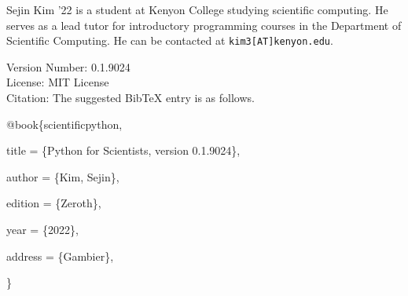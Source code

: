 \documentclass{book}
\newcommand{\booklicense}{MIT License}
\newcommand{\bookversion}{0.1.9024}
\begin{document}








\backmatter

\printindex

\noindent Sejin Kim '22 is a student at Kenyon College studying scientific computing. He serves as a lead tutor for introductory programming courses in the Department of Scientific Computing. He can be contacted at \verb|kim3[AT]kenyon.edu|.

\begin{titlepage}
\begin{flushleft}
Version Number: \bookversion\\
License: \booklicense\\
Citation: The suggested BibTeX entry is as follows.

\vspace{5mm}

{\selectfont
@book\{scientificpython,

    title = \{Python for Scientists, version \bookversion\},

    author = \{Kim, Sejin\},

    edition = \{Zeroth\},

    year = \{2022\},

    address = \{Gambier\},

\}
}
\end{flushleft}
\end{titlepage}
\restoregeometry
\end{document}
